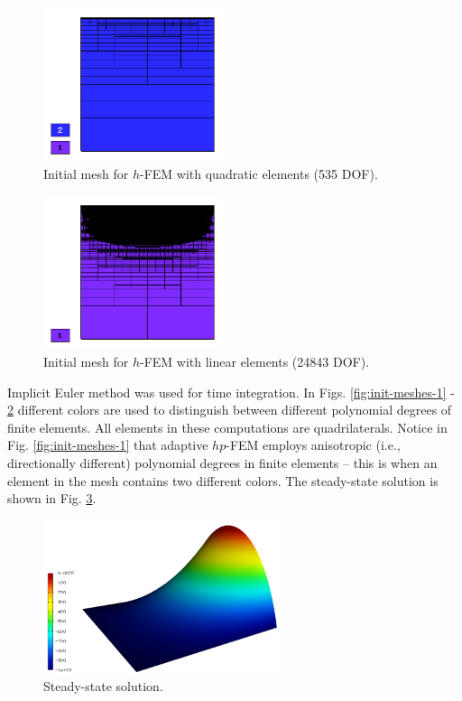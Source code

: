 \documentclass[final,3p,times,twocolumn]{elsarticle}
\begin{document}
\begin{figure}[!ht]
\begin{center}
\includegraphics[height=4.5cm]{mesh_init_h2.png}
\end{center}
\vspace{-6mm}
\caption{Initial mesh for $h$-FEM with quadratic elements (535 DOF).}
\label{fig:init-meshes-2}
\end{figure}

\begin{figure}[!ht]
\begin{center}
\includegraphics[height=4.5cm]{mesh_init_h1.png}
\end{center}
\vspace{-6mm}
\caption{Initial mesh for $h$-FEM with linear elements (24843 DOF).}
\label{fig:init-meshes-3}
\end{figure}
Implicit Euler method was used for time integration.
In Figs. \ref{fig:init-meshes-1} - \ref{fig:init-meshes-3} 
different colors are used to distinguish between 
different polynomial degrees of finite elements. All elements in these computations 
are quadrilaterals. Notice in Fig. \ref{fig:init-meshes-1} that adaptive $hp$-FEM employs
anisotropic (i.e., directionally different) polynomial degrees in finite 
elements -- this is when an element in the mesh contains two different colors. 
The steady-state solution is shown in Fig. \ref{fig:steady-state}. 

\begin{figure}[!ht]
\begin{center}
\includegraphics[height=4.5cm]{solution_final.png}
\end{center}
\vspace{-6mm}
\caption{Steady-state solution.}
\label{fig:steady-state}
\end{figure}
\end{document}
